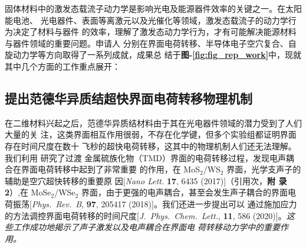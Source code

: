 固体材料中的激发态载流子动力学是影响光电及能源器件效率的关键之一。在太阳能电池、
光电器件、表面等离激元以及光催化等领域，激发态载流子的动力学行为决定了材料与器件
的效率，理解了激发态动力学行为，才有可能解决能源材料与器件领域的重要问题。申请人
分别在界面电荷转移、半导体电子空穴复合、自旋动力学等方向取得了一系列成就，成果总
结于\textbf{图-\ref{fig:fig_rep_work}}中，现就其中几个方面的工作重点展开：

\subsection{提出范德华异质结超快界面电荷转移物理机制}




在二维材料兴起之后，范德华异质结材料由于其在光电器件领域的潜力受到了人们大量的关
注，这类界面相互作用很弱，不存在化学键，但多个实验组都证明界面存在时间尺度在数十
飞秒的超快电荷转移，这其中的物理机制人们还无法理解。我们利用 \hnamd{} 研究了过渡
金属硫族化物（TMD）界面的电荷转移过程，发现电声耦合在界面电荷转移中起到了非常重要
的作用，在 MoS$_2$/WS$_2$ 界面，光学支声子的辅助是空穴超快转移的重要原
因[\textit{Nano Lett.} \textbf{17}, 6435 (2017)]（引用次，\textbf{附
  录2}）,在 MoSe$_2$/WSe$_2$ 界面，由于更强的电声耦合，甚至会发生声子耦合的界面电
荷振荡[\textit{Phys.\ Rev.\ B}, \textbf{97}, 205417 (2018)]。我们还进一步提出可以
通过施加应力的方法调控界面电荷转移的时间尺度[\textit{J.\ Phys.\ Chem.\ Lett.},
\textbf{11}, 586 (2020)]。\emph{这些工作成功地揭示了声子激发以及电声耦合在界面电
  荷转移动力学中的重要作用。}

